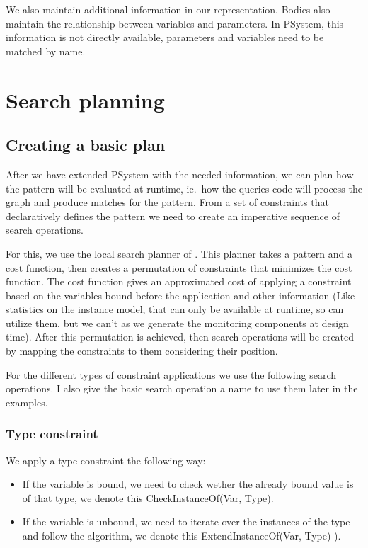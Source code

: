 We also maintain additional information in our representation. 
Bodies also maintain the relationship between variables and parameters. 
In PSystem, this information is not directly available, parameters and variables need to be matched by name.

\section{Search planning}

\subsection{Creating a basic plan}
After we have extended PSystem with the needed information, we can plan how the pattern will be evaluated at runtime, ie.\ how the queries code will process the graph and produce matches for the pattern.
From a set of constraints that declaratively defines the pattern we need to create an imperative sequence of search operations.

For this, we use the local search planner of \viatra{}.
This planner takes a pattern and a cost function, then creates a permutation of constraints that minimizes the cost function. 
The cost function gives an approximated cost of applying a constraint based on the variables bound before the application and other information (Like statistics on the instance model, that can only be available at runtime, so \viatra{} can utilize them, but we can't as we generate the monitoring components at design time). 
After this permutation is achieved, then search operations will be created by mapping the constraints to them considering their position.

For the different types of constraint applications we use the following search operations. I also give the basic search operation a name to use them later in the examples.


\subsubsection{Type constraint}
We apply a type constraint the following way:

\begin{itemize}
\item If the variable is bound, we need to check wether the already bound value is of that type, we denote this CheckInstanceOf(Var, Type).
\item If the variable is unbound, we need to iterate over the instances of the type and follow the algorithm, we denote this ExtendInstanceOf(Var, Type) ).
\end{itemize}


